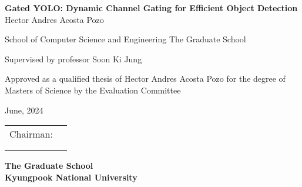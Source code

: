 \begin{titlepage}
    \begin{center}
        \textbf{\huge Gated YOLO: Dynamic Channel Gating for Efficient Object Detection \newline}  
        \textnormal{\Large Hector Andres Acosta Pozo}
        
        
        \textnormal{\large School of Computer Science and Engineering\newline}
        \textnormal{\large The Graduate School} 
        
        \textnormal{\large Supervised by professor Soon Ki Jung}
        
        \textnormal{\large Approved as a qualified thesis of Hector Andres Acosta Pozo \newline }
        \textnormal{\large for the degree of Masters of Science\newline}
        \textnormal{\large by the Evaluation Committee \newline}
        
        \textnormal{\large June, 2024}
        
        \begin{flushright}
        	\begin{tabular}{cl}
            \textnormal{Chairman}:	    & \underline{\makebox[2in][l]{Prof. Seok Joo Koh}}\\ 
             							& \underline{\makebox[2in][l]{Prof. Soon Ki Jung}}\\  
             							& \underline{\makebox[2in][l]{Prof. Yong Tae Kim}}\\ 
                                                                                
            \end{tabular}
        \end{flushright}
        \vfill 
        
       \textbf{\Large The Graduate School \\ Kyungpook National University}
        \vfill               
    \end{center}
\end{titlepage}